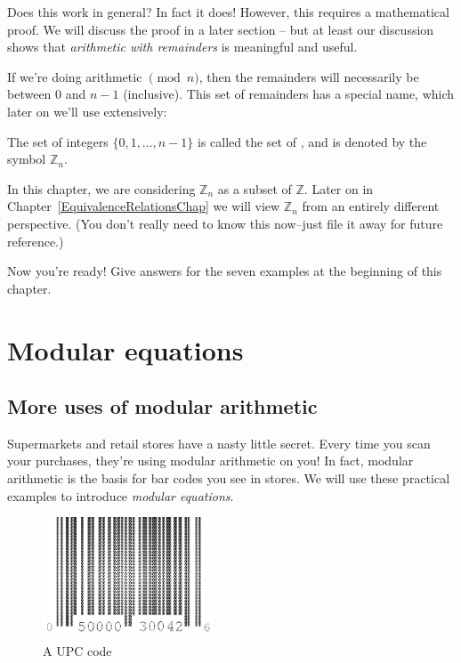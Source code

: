 Does this work in general? In fact it does! However, this requires a mathematical proof.  We will discuss the proof in a later section -- but at least our discussion shows that \emph{arithmetic with remainders} is meaningful and useful.

If we're doing arithmetic $\pmod{n}$, then the remainders will necessarily be between $0$ and $n-1$ (inclusive). This set of  remainders has a special name, which later on we'll use extensively:

\begin{defn}\label{integers_mod_n}
The set of integers $\{0,1,\ldots,n-1\}$ is called the set of , and is denoted by the symbol ${\mathbb Z}_n$.
\end{defn}

\begin{rem}
In this chapter, we are considering ${\mathbb Z}_n$ as a subset of $\mathbb{Z}$. Later on in Chapter~\ref{EquivalenceRelationsChap} we will view ${\mathbb Z}_n$ from an entirely different perspective. (You don't really need to know this now--just file it away for future reference.)
\end{rem}

\begin{exercise}{28}
Now you're ready! Give answers for the seven examples at the beginning of this chapter.
\end{exercise}

\section{Modular equations\quad
{}}\label{section:modular:ModularEquations}

\subsection{More uses of modular arithmetic  }
 
Supermarkets and retail stores have a nasty  little secret. Every time you scan your purchases, they're using modular arithmetic on you! In fact, modular arithmetic is the basis for  bar codes you see in stores. We will use these practical examples to introduce \emph{modular equations}. 

\begin{figure}
\begin{center}
\centerline {
\includegraphics[width=2in]{images/UPCcode.png}
}
\end{center}
\caption{A UPC code}
\label{groups_figure_3}
\end{figure}


